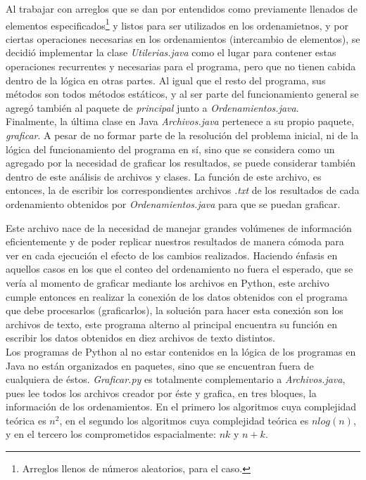 \documentclass[a4paper,12pt]{article}
\begin{document}
Al trabajar con arreglos que se dan por entendidos como previamente llenados de elementos especificados\footnote{Arreglos llenos de números aleatorios, para el caso.} y listos para ser utilizados en los ordenamietnos, y por ciertas operaciones necesarias en los ordenamientos (intercambio de elementos), se decidió implementar la clase \textit{Utilerias.java} como el lugar para contener estas operaciones recurrentes y necesarias para el programa, pero que no tienen cabida dentro de la lógica en otras partes. Al igual que el resto del programa, sus métodos son todos métodos estáticos, y al ser parte del funcionamiento general se agregó también al paquete de \textit{principal} junto a \textit{Ordenamientos.java}.\\

Finalmente, la última clase en Java \textit{Archivos.java} pertenece a su propio paquete, \textit{graficar}. A pesar de no formar parte de la resolución del problema inicial, ni de la lógica del funcionamiento del programa en sí, sino que se considera como un agregado por la necesidad de graficar los resultados, se puede considerar también dentro de este análisis de archivos y clases. La función de este archivo, es entonces, la de escribir los correspondientes archivos \textit{.txt} de los resultados de cada ordenamiento obtenidos por \textit{Ordenamientos.java} para que se puedan graficar.

Este archivo nace de la necesidad de manejar grandes volúmenes de información eficientemente y de poder replicar nuestros resultados de manera cómoda para ver en cada ejecución el efecto de los cambios realizados. Haciendo énfasis en aquellos casos en los que el conteo del ordenamiento no fuera el esperado, que se vería al momento de graficar mediante los archivos en Python, este archivo cumple entonces en realizar la conexión de los datos obtenidos con el programa que debe procesarlos (graficarlos), la solución para hacer esta conexión son los archivos de texto, este programa alterno al principal encuentra su función en escribir los datos obtenidos en diez archivos de texto distintos.\\

Los programas de Python al no estar contenidos en la lógica de los programas en Java no están organizados en paquetes, sino que se encuentran fuera de cualquiera de éstos. \textit{Graficar.py} es totalmente complementario a \textit{Archivos.java}, pues lee todos los archivos creador por éste y grafica, en tres bloques, la información de los ordenamientos. En el primero los algoritmos cuya complejidad teórica es $n^2$, en el segundo los algoritmos cuya complejidad teórica es $n log(n)$, y en el tercero los comprometidos espacialmente: $nk$ y $n+k$.
\end{document}
